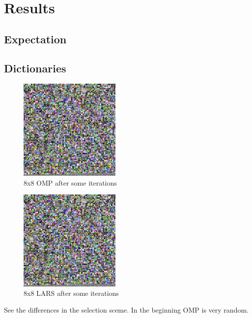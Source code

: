 \chapter{Results}

\section{Expectation}

\section{Dictionaries}

\begin{figure}
\centering
\includegraphics[width = 0.44\textwidth]{images/8_4000_10000_10_lasso.png} 
\caption{8x8 OMP after some iterations}
\label{fig:8_4000_lasso}
\end{figure}

\begin{figure}
\centering
\includegraphics[width = 0.44\textwidth]{images/8_4000_10000_10_lasso.png} 
\caption{8x8 LARS after some iterations}
\label{fig:8_4000_lasso}
\end{figure}

See the differences in the selection sceme.
In the beginning OMP is very random.

